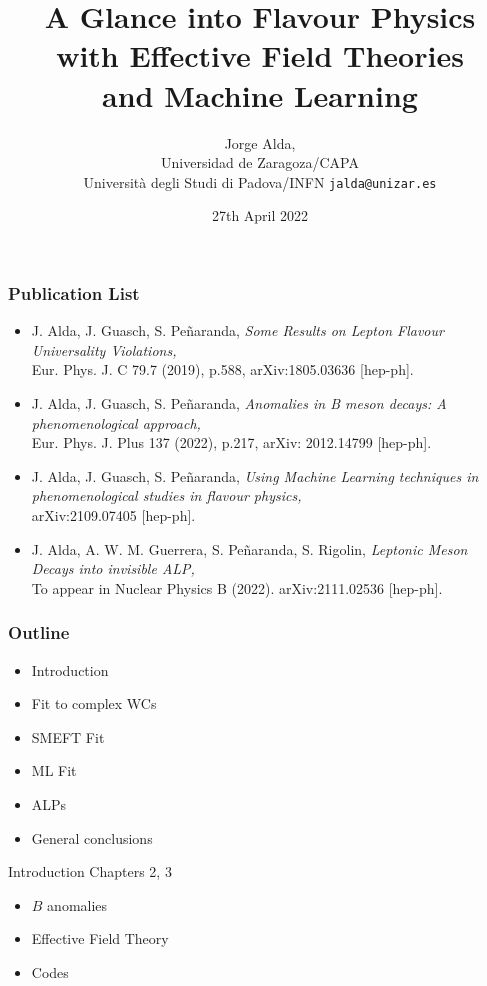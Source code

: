 \documentclass[mathserif, 10pt]{beamer}
\title[A Glance into Flavour Physics...]{A Glance into Flavour Physics \\with Effective Field Theories\\ and Machine Learning}
\author[Jorge Alda]{Jorge Alda,\\ Universidad de Zaragoza/CAPA\\
Università degli Studi di Padova/INFN \hspace{2em} \texttt{jalda@unizar.es} }
\date[PhD Thesis]{27th April 2022}
\begin{document}
\begin{frame}

\titlepage

\end{frame}

\begin{frame}\frametitle{Publication List}

\begin{itemize}\color{red}
        \item J. Alda, J. Guasch, S. Peñaranda,
              \textit{Some Results on Lepton Flavour Universality Violations,}\\
              Eur. Phys. J. C 79.7 (2019), p.588, arXiv:1805.03636 [hep-ph].
        \item J. Alda, J. Guasch, S. Peñaranda, \textit{Anomalies in B meson decays: A phenomenological approach,}\\
              Eur. Phys. J. Plus 137 (2022), p.217, arXiv: 2012.14799 [hep-ph].
        \item J. Alda, J. Guasch, S. Peñaranda,
              \textit{Using Machine Learning techniques in phenomenological studies in flavour physics,}\\
              arXiv:2109.07405 [hep-ph].
        \item J. Alda, A. W. M. Guerrera, S. Peñaranda, S. Rigolin,
              \textit{Leptonic Meson Decays into invisible ALP,}\\
To appear in Nuclear Physics B (2022). arXiv:2111.02536 [hep-ph].
    \end{itemize}

\end{frame}


\begin{frame}\frametitle{Outline}
    \begin{itemize}
        \item Introduction
        \item Fit to complex WCs
        \item SMEFT Fit
        \item ML Fit
        \item ALPs
        \item General conclusions
    \end{itemize}
\end{frame}

\begin{frame}[plain] %
\begin{block}{\huge Introduction}
Chapters 2, 3
\end{block}
\vspace{1cm}
\begin{itemize}
    \item $B$ anomalies
    \item Effective Field Theory
    \item Codes
\end{itemize}
\end{frame}
\end{document}

